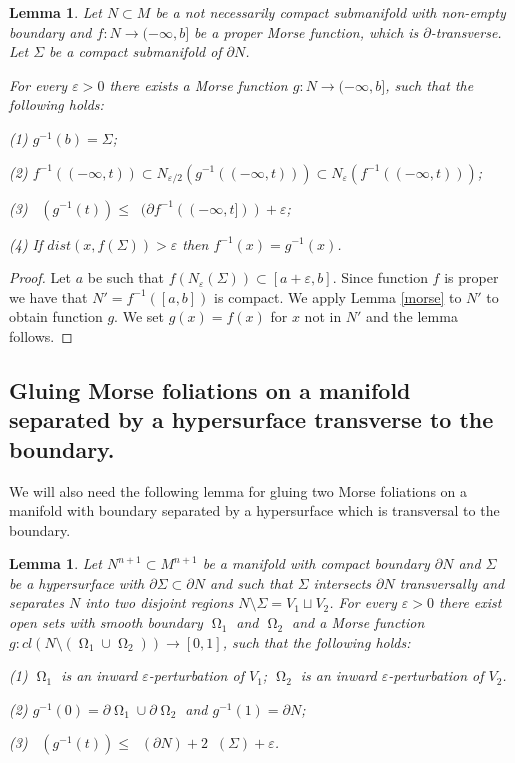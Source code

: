 \documentclass[12pt]{amsart}
\newtheorem{lemma}[theorem]{Lemma}
\DeclareMathOperator{\Hn}{\mathcal{H}^n}
\DeclareMathOperator{\Om}{\Omega}
\theoremstyle{definition}
\begin{document}
\begin{lemma} \label{morse_noncompact}
Let $N \subset M$ be a not necessarily compact submanifold 
with non-empty boundary and $f: N \rightarrow (-\infty,b]$
be a proper Morse function, which is $\partial$-transverse. Let $\Sigma$ be
a compact submanifold of $\partial N$.

For every $\varepsilon >0$ there exists a Morse function $g: N \rightarrow (-\infty,b]$,
such that the following holds:

(1) %
$g^{-1}(b) = \Sigma$;

(2) $f^{-1}((-\infty,t)) \subset N_{\varepsilon/2} (g^{-1}((-\infty,t))) \subset N_{\varepsilon}(f^{-1}((-\infty,t)))$;

(3) $ \Hn(g^{-1}(t)) \leq \Hn(\partial f^{-1}((-\infty,t])) + \varepsilon$;

(4) If $dist(x, f(\Sigma))> \varepsilon$ then $f^{-1} (x) = g^{-1}(x)$.
\end{lemma}

\begin{proof}
Let $a$ be such that $f(N_{\varepsilon} (\Sigma)) \subset [a+\varepsilon,b]$.
Since function $f$ is proper we have that $N' = f^{-1} ([a,b])$
is compact. We apply Lemma \ref*{morse}
to $N'$ to obtain function $g$. 
We set $g(x)=f(x)$ for $x$ not in $N'$ and the lemma follows.
\end{proof}

\subsection{Gluing Morse foliations 
on a manifold separated by a hypersurface
transverse to the boundary.}


We will also need the following lemma for
gluing two Morse foliations
on a manifold with boundary
separated by a hypersurface
which is transversal to the boundary.

\begin{lemma} \label{gluing_separated}
Let $N^{n+1} \subset M^{n+1}$ be a manifold with compact
boundary $\partial N$ and $\Sigma$ be
a hypersurface with $\partial \Sigma 
\subset \partial N$ and such that
$\Sigma$ intersects $\partial N$
transversally and separates $N$ into two disjoint
regions $N \setminus \Sigma = V_1 \sqcup V_2$.
For every $\varepsilon >0$ there exist 
open sets with smooth boundary
$\Om_1$ and $\Om_2$ and a Morse
function $g: cl(N \setminus (\Om_1 \cup \Om_2))
\rightarrow [0,1]$, such that the following
holds:

(1) $\Om_1$ is an inward $\varepsilon$-perturbation of $V_1$;
$\Om_2$ is an inward $\varepsilon$-perturbation of $V_2$.


(2) $g^{-1}(0) = \partial \Om_1 \cup \partial \Om_2$
and $g^{-1}(1) = \partial N$;

(3) $\Hn(g^{-1}(t)) \leq \Hn(\partial N) + 
2 \Hn(\Sigma) + \varepsilon$.

\end{lemma}
\end{document}
